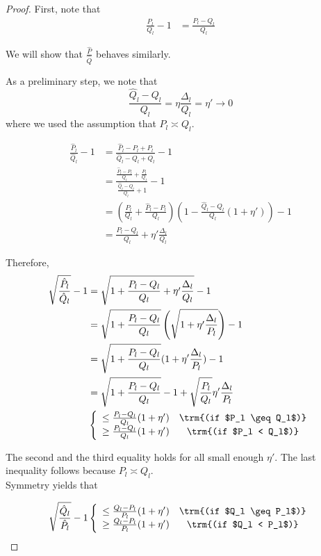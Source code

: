 \documentclass{article}
\begin{document}
\begin{proof}


First, note that 
\begin{align*}
 \frac{P_l}{Q_l} - 1 &= \frac{P_l - Q_l}{Q_l}  
\end{align*}

We will show that $\frac{\hat{P}}{\hat{Q}}$ behaves similarly. 

As a preliminary step, we note that
\[
\frac{\hat{Q}_l - Q_l}{Q_l} = \eta \frac{\Delta_l}{Q_l} = \eta' \rightarrow 0
\]
where we used the assumption that $P_l \asymp Q_l$.

\begin{align*}
\frac{\hat{P}_l}{\hat{Q}_l} - 1 &= 
     \frac{ \hat{P}_l - P_l + P_l }{ \hat{Q}_l - Q_l + Q_l} -1  \\
  &=  \frac{  \frac{\hat{P}_l - P_l}{Q_l} + \frac{P_l}{Q_l}}
       { \frac{\hat{Q}_l - Q_l}{Q_l} + 1} - 1 \\
 &= \left( \frac{P_l}{Q_l} + \frac{\hat{P}_l - P_l}{Q_l} \right)
    \left( 1 - \frac{\hat{Q}_l - Q_l}{Q_l} (1 + \eta')  \right) -1  \\
 &= \frac{P_l-Q_l}{Q_l} + \eta' \frac{\Delta_l}{Q_l} 
\end{align*}



Therefore, 
\begin{align*}
\sqrt{ \frac{\hat{P}_l}{\hat{Q}_l}} - 1 &= 
   \sqrt{ 1 + \frac{P_l - Q_l}{Q_l} + \eta' \frac{\Delta_l}{Q_l}}  - 1\\
  &= \sqrt{ 1 + \frac{P_l - Q_l}{Q_l} } 
    \left( \sqrt{ 1 + \eta' \frac{\Delta_l}{P_l}} \right) - 1 \\
  &= \sqrt{ 1 + \frac{P_l - Q_l}{Q_l} } (1 + \eta' \frac{\Delta_l}{P_l} ) - 1  \\
  &= \sqrt{ 1 + \frac{P_l - Q_l}{Q_l}} - 1 + \sqrt{ \frac{P_l}{Q_l}} \eta' \frac{\Delta_l}{P_l} \\ 
  & \left\{ \begin{array}{cc}
      \leq \frac{P_l - Q_l}{Q_l} (1+ \eta') & \trm{(if $P_l \geq Q_l$)} \\
      \geq \frac{P_l - Q_l}{Q_l} (1+ \eta') & \trm{(if $P_l < Q_l$)} 
     \end{array} \right.
\\
\end{align*}

The second and the third equality holds for all small enough $\eta'$. The last inequality follows because $P_l \asymp Q_l$. \\


Symmetry yields that 

\begin{align*}
\sqrt{ \frac{\hat{Q}_l}{\hat{P}_l} } - 1  &
   \left\{ \begin{array}{cc}
      \leq \frac{Q_l - P_l}{P_l} (1 + \eta') & \trm{(if $Q_l \geq P_l$)} \\
      \geq \frac{Q_l - P_l}{P_l} (1 + \eta') & \trm{(if $Q_l < P_l$)} 
     \end{array} \right. \\
\end{align*}


\end{proof}
\end{document}
